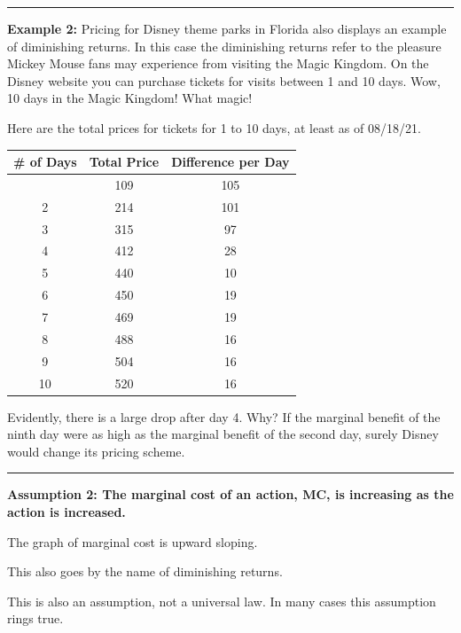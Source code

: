 \documentclass[
]{book}
\begin{document}
\begin{center}\rule{0.5\linewidth}{0.5pt}\end{center}

\textbf{Example 2:} Pricing for Disney theme parks in Florida also displays an example of diminishing returns. In this case the diminishing returns refer to the pleasure Mickey Mouse fans may experience from visiting the Magic Kingdom. On the Disney website you can purchase tickets for visits between 1 and 10 days. Wow, 10 days in the Magic Kingdom! What magic!

Here are the total prices for tickets for 1 to 10 days, at least as of 08/18/21.

\begin{longtable}[]{@{}ccc@{}}
\toprule\noalign{}
\# of Days & Total Price & Difference per Day \\
\midrule\noalign{}
\endhead
\bottomrule\noalign{}
\endlastfoot
1 & 109 & 105 \\
2 & 214 & 101 \\
3 & 315 & 97 \\
4 & 412 & 28 \\
5 & 440 & 10 \\
6 & 450 & 19 \\
7 & 469 & 19 \\
8 & 488 & 16 \\
9 & 504 & 16 \\
10 & 520 & 16 \\
\end{longtable}

Evidently, there is a large drop after day 4. Why? If the marginal benefit of the ninth day were as high as the marginal benefit of the second day, surely Disney would change its pricing scheme.

\begin{center}\rule{0.5\linewidth}{0.5pt}\end{center}

\begin{center}
\textbf{Assumption 2: The marginal cost of an action, MC, is increasing as the action is increased.}

\end{center}

The graph of marginal cost is upward sloping.

This also goes by the name of diminishing returns.

This is also an assumption, not a universal law. In many cases this assumption rings true.
\end{document}
